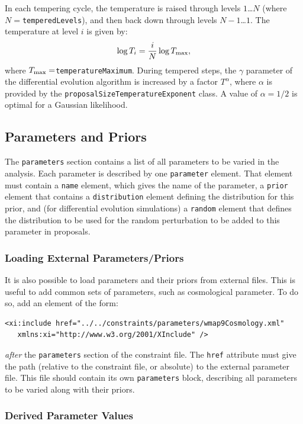 In each tempering cycle, the temperature is raised through levels $1$\ldots$N$ (where $N=${\tt temperedLevels}), and then back down through levels $N-1$\ldots$1$. The temperature at level $i$ is given by:
\begin{equation}
\log T_i = {i \over N} \log T_{\rm max},
\end{equation}
where $T_{\rm max}=${\tt temperatureMaximum}. During tempered steps, the $\gamma$ parameter of the differential evolution algorithm is increased by a factor $T^\alpha$, where $\alpha$ is provided by the {\tt proposalSizeTemperatureExponent} class. A value of $\alpha=1/2$ is optimal for a Gaussian likelihood.

\subsection{Parameters and Priors}\label{sec:ParametersPriors}

The {\tt parameters} section contains a list of all parameters to be varied in the analysis. Each parameter is described by one {\tt parameter} element. That element must contain a {\tt name} element, which gives the name of the parameter, a {\tt prior} element that contains a {\tt distribution} element defining the distribution for this prior, and (for differential evolution simulations) a {\tt random} element that defines the distribution to be used for the random perturbation to be added to this parameter in proposals.

\subsubsection{Loading External Parameters/Priors}

It is also possible to load parameters and their priors from external files. This is useful to add common sets of parameters, such as cosmological parameter. To do so, add an element of the form:
\begin{verbatim}
<xi:include href="../../constraints/parameters/wmap9Cosmology.xml" 
   xmlns:xi="http://www.w3.org/2001/XInclude" />
\end{verbatim}
\emph{after} the {\tt parameters} section of the constraint file. The {\tt href} attribute must give the path (relative to the constraint file, or absolute) to the external parameter file. This file should contain its own {\tt parameters} block, describing all parameters to be varied along with their priors. 

\subsubsection{Derived Parameter Values}

